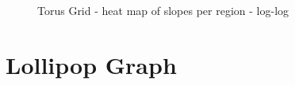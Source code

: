  \begin{figure}
     \centering
     \caption{Torus Grid - heat map of slopes per region - log-log}
     \label{fig:torusgraphslopes}
 \end{figure}

 \section{Lollipop Graph}\label{sec:lollipopgraph}
